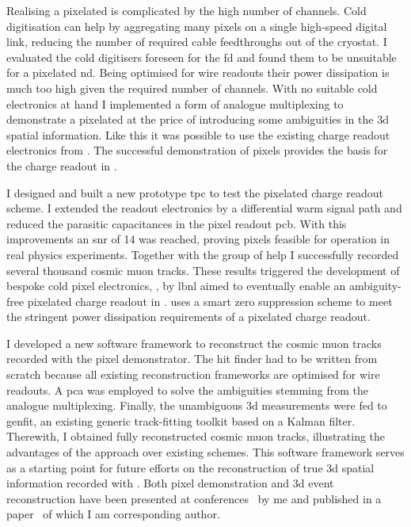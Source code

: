Realising a pixelated \lartpc{} is complicated by the high number of channels.
Cold digitisation can help by aggregating many pixels on a single high-speed digital link, reducing the number of required cable feedthroughs out of the cryostat.
I evaluated the cold digitisers foreseen for the \dune{} \gls{fd} and found them to be unsuitable for a pixelated \gls{nd}.
Being optimised for wire readouts their power dissipation is much too high given the required number of channels.
With no suitable cold electronics at hand I implemented a form of analogue multiplexing to demonstrate a pixelated \lartpc{} at the price of introducing some ambiguities in the \gls{3d} spatial information.
Like this it was possible to use the existing charge readout electronics from \AT{}.
The successful demonstration of pixels provides the basis for the charge readout in \AC{}.

I designed and built a new prototype \gls{tpc} to test the pixelated charge readout scheme.
I extended the \AT{} readout electronics by a differential warm signal path and reduced the parasitic capacitances in the pixel readout \gls{pcb}.
With this improvements an \gls{snr} of \num{14} was reached, proving pixels feasible for operation in real physics experiments.
Together with the \lar{} group of \gls{help} I successfully recorded several thousand cosmic muon tracks.
These results triggered the development of bespoke cold pixel electronics, \larpix{}, by \gls{lbnl} aimed to eventually enable an ambiguity-free pixelated charge readout in \AC{}.
\larpix{} uses a smart zero suppression scheme to meet the stringent power dissipation requirements of a pixelated charge readout.

I developed a new software framework to reconstruct the cosmic muon tracks recorded with the pixel demonstrator.
The hit finder had to be written from scratch because all existing \lartpc{} reconstruction frameworks are optimised for wire readouts.
A \gls{pca} was employed to solve the ambiguities stemming from the analogue multiplexing.
Finally, the unambiguous \gls{3d} measurements were fed to \gls{genfit}, an existing generic track-fitting toolkit based on a Kalman filter.
Therewith, I obtained fully reconstructed cosmic muon tracks, illustrating the advantages of the \AC{} approach over existing schemes.
This software framework serves as a starting point for future efforts on the reconstruction of true \gls{3d} spatial information recorded with \AC{}.
Both pixel demonstration and \gls{3d} event reconstruction have been presented at conferences~\cite{pixel_proceedings} by me and published in a paper~\cite{pixel_paper} of which I am corresponding author.

